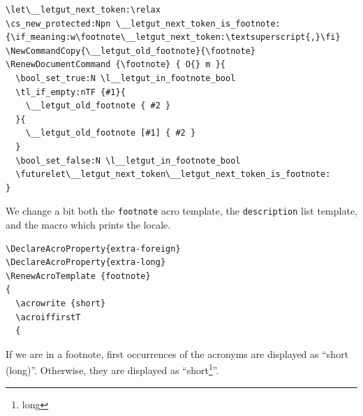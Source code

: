 \documentclass{letgut}
\begin{document}
\begin{lstlisting}
\let\__letgut_next_token:\relax
\cs_new_protected:Npn \__letgut_next_token_is_footnote:
{\if_meaning:w\footnote\__letgut_next_token:\textsuperscript{,}\fi}
\NewCommandCopy{\__letgut_old_footnote}{\footnote}
\RenewDocumentCommand {\footnote} { O{} m }{
  \bool_set_true:N \l__letgut_in_footnote_bool
  \tl_if_empty:nTF {#1}{
    \__letgut_old_footnote { #2 }
  }{
    \__letgut_old_footnote [#1] { #2 }
  }
  \bool_set_false:N \l__letgut_in_footnote_bool
  \futurelet\__letgut_next_token\__letgut_next_token_is_footnote:
}
\end{lstlisting}
We change a bit both the \lstinline+footnote+ acro template, the \lstinline+description+ list
template, and the macro which prints the locale.
\begin{lstlisting}
\DeclareAcroProperty{extra-foreign}
\DeclareAcroProperty{extra-long}
\RenewAcroTemplate {footnote}
{
  \acrowrite {short}
  \acroiffirstT
  {
\end{lstlisting}
If we are in a footnote, first occurrences of the acronyms are displayed
as “short (long)”. Otherwise, they are displayed as “short\footnote{long}”.
\end{document}
